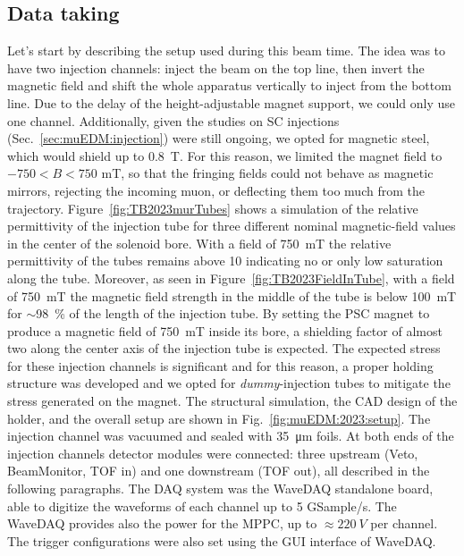 \begin{refsection}
    \subsection{Data taking}
        Let's start by describing the setup used during this beam time.
        The idea was to have two injection channels: inject the beam on the top line, then invert the magnetic field and shift the whole apparatus vertically to inject from the bottom line.
        Due to the delay of the height-adjustable magnet support, we could only use one channel.
        Additionally, given the studies on SC injections (Sec.~\ref{sec:muEDM:injection}) were still ongoing, we opted for magnetic steel, which would shield up to \SI{0.8}{T}. 
        For this reason, we limited the magnet field to $-750<B<750$ mT, so that the fringing fields could not behave as magnetic mirrors, rejecting the incoming muon, or deflecting them too much from the trajectory.
        Figure~\ref{fig:TB2023murTubes} shows a simulation of the relative permittivity of the injection tube for three different nominal magnetic-field values in the center of the solenoid bore. With a field of \SI{750}{\milli\tesla} the relative permittivity of the tubes remains above 10 indicating no or only low saturation along the tube. Moreover, as seen in Figure~\ref{fig:TB2023FieldInTube}, with a field of \SI{750}{\milli\tesla} the magnetic field strength in the middle of the tube is below \SI{100}{\milli\tesla} for $\sim$\SI{98}{\%} of the length of the injection tube. 
        By setting the PSC magnet to produce a magnetic field of \SI{750}{\milli\tesla} inside its bore, a shielding factor of almost two along the center axis of the injection tube is expected.
        The expected stress for these injection channels is significant and for this reason, a proper holding structure was developed and we opted for \textit{dummy}-injection tubes to mitigate the stress generated on the magnet.
        The \ansys structural simulation, the CAD design of the holder, and the overall setup are shown in Fig.~\ref{fig:muEDM:2023:setup}.
        The injection channel was vacuumed and sealed with \SI{35}{\micro\meter} \mylar foils.
        At both ends of the injection channels detector modules were connected: three upstream (Veto, BeamMonitor, TOF in) and one downstream (TOF out), all described in the following paragraphs.
        The DAQ system was the WaveDAQ standalone board, able to digitize the waveforms of each channel up to 5 GSample/s. 
        The WaveDAQ provides also the power for the MPPC, up to $\approx\SI{220}{V}$ per channel. 
        The trigger configurations were also set using the GUI interface of WaveDAQ. 


\end{refsection}
